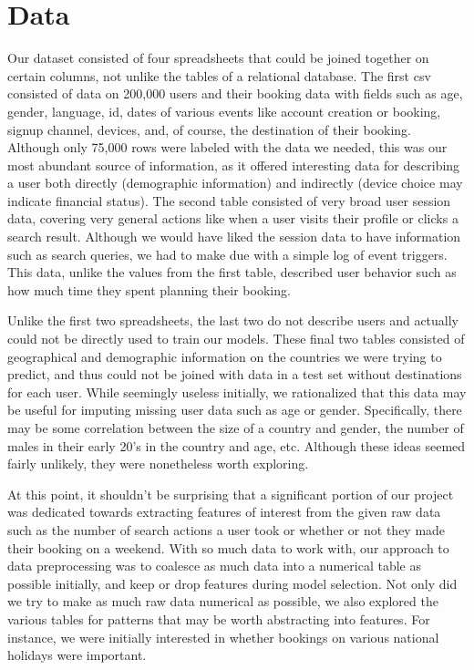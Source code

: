 \documentclass[a4paper, 11pt]{article}
\begin{document}
\section*{Data}
\par
Our dataset consisted of four spreadsheets that could be joined together on certain columns, not unlike the tables of a relational database. The first csv consisted of data on 200,000 users and their booking data with fields such as age, gender, language, id, dates of various events like account creation or booking, signup channel, devices, and, of course, the destination of their booking. Although only 75,000 rows were labeled with the data we needed, this was our most abundant source of information, as it offered interesting data for describing a user both directly (demographic information) and indirectly (device choice may indicate financial status). The second table consisted of very broad user session data, covering very general actions like when a user visits their profile or clicks a search result. Although we would have liked the session data to have information such as search queries, we had to make due with a simple log of event triggers. This data, unlike the values from the first table, described user behavior such as how much time they spent planning their booking.
\par
Unlike the first two spreadsheets, the last two do not describe users and actually could not be directly used to train our models. These final two tables consisted of geographical and demographic information on the countries we were trying to predict, and thus could not be joined with data in a test set without destinations for each user. While seemingly useless initially, we rationalized that this data may be useful for imputing missing user data such as age or gender. Specifically, there may be some correlation between the size of a country and gender, the number of males in their early 20’s in the country and age, etc. Although these ideas seemed fairly unlikely, they were nonetheless worth exploring.
\par
 At this point, it shouldn’t be surprising that a significant portion of our project was dedicated towards extracting features of interest from the given raw data such as the number of search actions a user took or whether or not they made their booking on a weekend. With so much data to work with, our approach to data preprocessing was to coalesce as much data into a numerical table as possible initially, and keep or drop features during model selection. Not only did we try to make as much raw data numerical as possible, we also explored the various tables for patterns that may be worth abstracting into features. For instance, we were initially interested in whether bookings on various national holidays were important.
 
\end{document}
